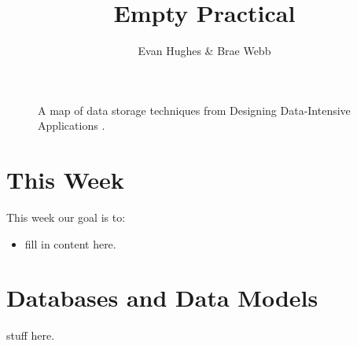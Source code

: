\documentclass{csse4400}
\title{Empty Practical}
\author{Evan Hughes \& Brae Webb}
\date{\week{0}}
\begin{document}
\maketitle

\begin{figure}[h]
  \href{https://www.oreilly.com/library/view/designing-data-intensive-applications/9781491903063/ch02.html}{
  }
\caption{A map of data storage techniques from Designing Data-Intensive Applications \cite{data-intensive}.}
\end{figure}


\section{This Week}
This week our goal is to:
\begin{itemize}
  \item fill in content here.
\end{itemize}

\section{Databases and Data Models}
stuff here.





\end{document}
